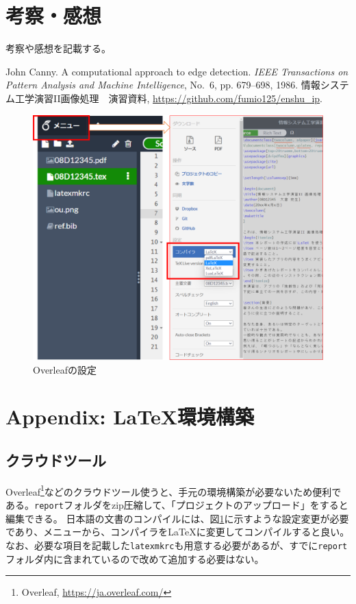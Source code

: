 \documentclass[twocolumn, a4paper]{jsarticle}
\begin{document}
\section{考察・感想}
考察や感想を記載する。

\begin{thebibliography}{99}
 John Canny. A computational approach to edge detection. {\em IEEE Transactions on Pattern Analysis and Machine Intelligence},  No.~6, pp. 679--698, 1986.
 情報システム工学演習II画像処理　演習資料, \url{https://github.com/fumio125/enshu_ip}.
\end{thebibliography}


\begin{figure}[t]
\centering
\includegraphics[width=\linewidth]{overleaf.png}
\caption{Overleafの設定}
\label{fig:overleaf}
\end{figure}

\section*{Appendix: \LaTeX 環境構築}
\subsection*{クラウドツール}
Overleaf\footnote{Overleaf, \url{https://ja.overleaf.com/}}などのクラウドツール使うと、手元の環境構築が必要ないため便利である。\texttt{report}フォルダをzip圧縮して、「プロジェクトのアップロード」をすると編集できる。
日本語の文書のコンパイルには、図\ref{fig:overleaf}に示すような設定変更が必要であり、メニューから、コンパイラをLaTeXに変更してコンパイルすると良い。
なお、必要な項目を記載した\texttt{latexmkrc}も用意する必要があるが、すでに\texttt{report}フォルダ内に含まれているので改めて追加する必要はない。
\end{document}
